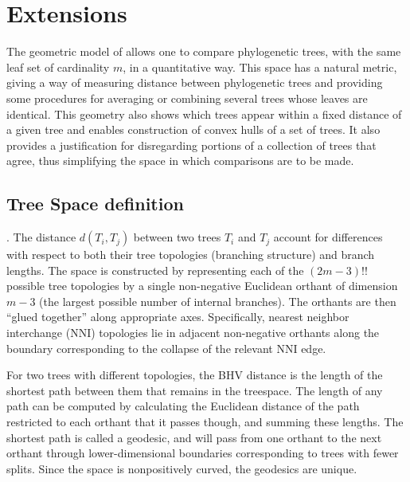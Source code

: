 \section{Extensions} \label{sec:extensions}


The  geometric  model of \cite{Billera2001} allows one to compare phylogenetic  trees,  with  the  same  leaf  set  of  cardinality $m$, in a quantitative way.  This  space  has  a  natural  metric, giving a way of measuring distance between phylogenetic trees and providing some procedures for averaging or combining several trees whose leaves are identical. This geometry also shows which trees appear within a fixed distance of a given tree and enables construction of convex hulls of a
set of trees. It also provides a justification for disregarding portions of a collection of trees that agree,  thus simplifying the space in which comparisons are to be made.

\subsection{Tree Space definition} \label{sec:Tree-distances}
 . The distance $d(T_i,T_j)$ between two trees $T_i$ and $T_j$ account for differences with respect to both their tree topologies (branching structure) and branch lengths. The space is constructed by representing each of the $(2m-3)!!$ possible tree topologies by a single non-negative Euclidean orthant of dimension $m-3$ (the largest possible number of internal branches). The orthants are then “glued together” along appropriate axes. Specifically, nearest neighbor interchange (NNI) topologies lie in adjacent non-negative orthants along the boundary corresponding to the collapse of the relevant NNI edge.

For two trees with different topologies, the BHV distance is the length of the shortest path between them that remains in the treespace.  The length of any path can be computed by calculating the Euclidean distance of the path restricted to each orthant that it passes though, and summing these lengths.  The shortest path is called a geodesic, and will pass from one orthant to the next orthant through lower-dimensional boundaries
corresponding to trees with fewer splits. Since the space is nonpositively  curved, the  geodesics are unique. 

